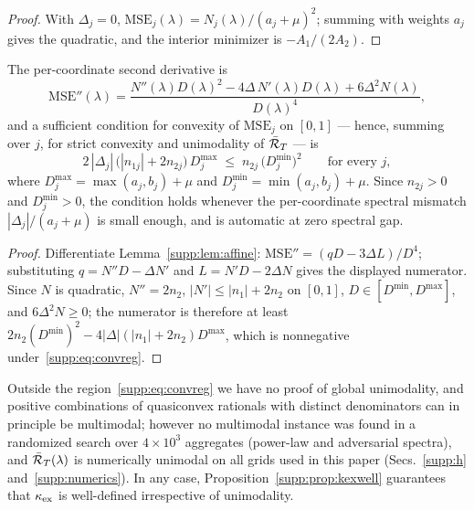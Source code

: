 \begin{proof}
With $\Delta_j = 0$, $\mathrm{MSE}_j(\lambda) = N_j(\lambda)/(a_j+\mu)^2$; summing with weights $a_j$ gives the quadratic, and the interior minimizer is $-A_1/(2A_2)$.
\end{proof}

\begin{proposition}\label{supp:prop:convreg}
The per-coordinate second derivative is
\begin{equation}
\mathrm{MSE}''(\lambda) = \frac{N''(\lambda)D(\lambda)^2 - 4\Delta\, N'(\lambda)D(\lambda) + 6\Delta^2 N(\lambda)}{D(\lambda)^4},
\end{equation}
and a sufficient condition for convexity of $\mathrm{MSE}_j$ on $[0,1]$ --- hence, summing over $j$, for strict convexity and unimodality of $\bar{\mathcal{R}}_T$ --- is
\begin{equation}
2\,|\Delta_j|\,\big(|n_{1j}| + 2 n_{2j}\big)\,D_j^{\max} \;\le\; n_{2j}\,\big(D_j^{\min}\big)^2
\qquad\text{for every } j,
\label{supp:eq:convreg}
\end{equation}
where $D_j^{\max} = \max(a_j, b_j) + \mu$ and $D_j^{\min} = \min(a_j, b_j) + \mu$.
Since $n_{2j} > 0$ and $D_j^{\min} > 0$, the condition holds whenever the per-coordinate spectral mismatch $|\Delta_j|/(a_j + \mu)$ is small enough, and is automatic at zero spectral gap.
\end{proposition}

\begin{proof}
Differentiate Lemma~\ref{supp:lem:affine}: $\mathrm{MSE}'' = (qD - 3\Delta L)/D^4$; substituting $q = N''D - \Delta N'$ and $L = N'D - 2\Delta N$ gives the displayed numerator.
Since $N$ is quadratic, $N'' = 2n_2$, $|N'| \le |n_1| + 2n_2$ on $[0,1]$, $D \in [D^{\min}, D^{\max}]$, and $6\Delta^2 N \ge 0$; the numerator is therefore at least $2 n_2 (D^{\min})^2 - 4|\Delta|(|n_1| + 2n_2) D^{\max}$, which is nonnegative under~\eqref{supp:eq:convreg}.
\end{proof}

Outside the region~\eqref{supp:eq:convreg} we have no proof of global unimodality, and positive combinations of quasiconvex rationals with distinct denominators can in principle be multimodal; however no multimodal instance was found in a randomized search over $4\times10^3$ aggregates (power-law and adversarial spectra), and $\bar{\mathcal{R}}_T(\lambda)$ is numerically unimodal on all grids used in this paper (Secs.~\ref{supp:h} and~\ref{supp:numerics}).
In any case, Proposition~\ref{supp:prop:kexwell} guarantees that $\kappa_{\mathrm{ex}}$ is well-defined irrespective of unimodality.


